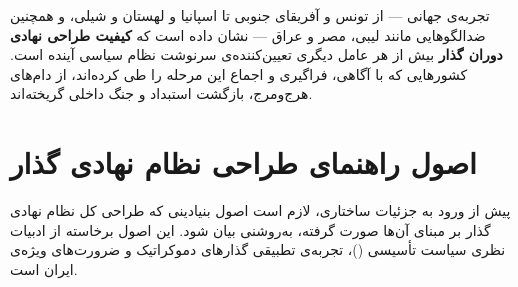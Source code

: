 \documentclass[12pt,a4paper,twoside,openany]{book}
\begin{document}
	\begin{summarybox}
		تجربه‌ی جهانی --- از تونس و آفریقای جنوبی تا اسپانیا و لهستان و شیلی، و همچنین
		ضدالگوهایی مانند لیبی، مصر و عراق --- نشان داده است که \textbf{کیفیت طراحی نهادی
			دوران گذار} بیش از هر عامل دیگری تعیین‌کننده‌ی سرنوشت نظام سیاسی آینده است.
		کشورهایی که با آگاهی، فراگیری و اجماع این مرحله را طی کرده‌اند، از دام‌های هرج‌ومرج،
		بازگشت استبداد و جنگ داخلی گریخته‌اند.
	\end{summarybox}
	
	\chapter{اصول راهنمای طراحی نظام نهادی گذار}
	\label{ch:principles}
	
	پیش از ورود به جزئیات ساختاری، لازم است اصول بنیادینی که طراحی کل نظام نهادی گذار
	بر مبنای آن‌ها صورت گرفته، به‌روشنی بیان شود. این اصول برخاسته از ادبیات نظری سیاست
	تأسیسی ()، تجربه‌ی تطبیقی گذارهای دموکراتیک و ضرورت‌های
	ویژه‌ی ایران است.
	
\end{document}
